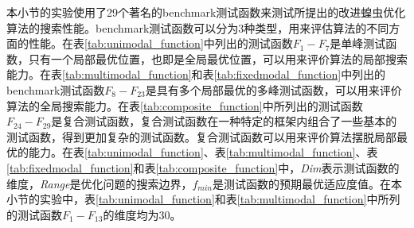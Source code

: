 本小节的实验使用了29个著名的benchmark测试函数来测试所提出的改进蝗虫优化算法的搜索性能。benchmark测试函数可以分为3种类型，用来评估算法的不同方面的性能。在表\ref{tab:unimodal_function}中列出的测试函数$F_1-F_7$是单峰测试函数，只有一个局部最优位置，也即是全局最优位置，可以用来评价算法的局部搜索能力。在表\ref{tab:multimodal_function}和表\ref{tab:fixedmodal_function}中列出的benchmark测试函数$F_8-F_{23}$是具有多个局部最优的多峰测试函数，可以用来评价算法的全局搜索能力\cite{saremi2017grasshopper}。在表\ref{tab:composite_function}中所列出的测试函数$F_{24}-F_{29}$是复合测试函数\cite{liang2005novel}，复合测试函数在一种特定的框架内组合了一些基本的测试函数，得到更加复杂的测试函数。复合测试函数可以用来评价算法摆脱局部最优的能力。在表\ref{tab:unimodal_function}、表\ref{tab:multimodal_function}、表\ref{tab:fixedmodal_function}和表\ref{tab:composite_function}中，\emph{Dim}表示测试函数的维度，\emph{Range}是优化问题的搜索边界，$f_{min}$是测试函数的预期最优适应度值。在本小节的实验中，表\ref{tab:unimodal_function}和表\ref{tab:multimodal_function}中所列的测试函数$F_1-F_{13}$的维度均为30。

